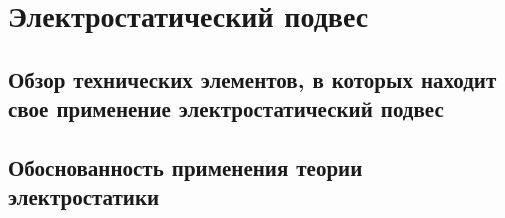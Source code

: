 \chapter{Электростатический подвес} \label{chapt4}

\section{Обзор технических элементов, в которых находит свое применение электростатический подвес} \label{sect4_1}



\section{Обоснованность применения теории электростатики} \label{sect4_2}

